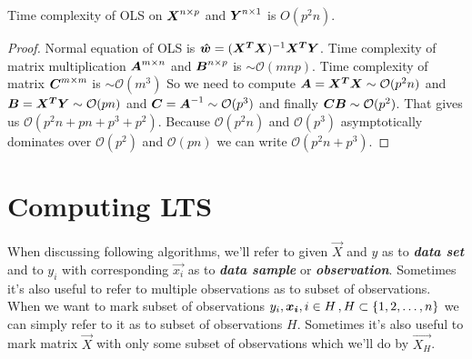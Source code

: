\begin{lemma}
	Time complexity of OLS  on $\m{X}^{n \times p}$ and $\m{Y}^{n \times 1}$ is $O(p^2n)$.
\end{lemma}

\begin{proof}
	Normal equation of OLS is $\vec{\hat{w}} = (\m{X^T}\m{X})^{-1}\m{X^T}\m{Y}$.
	Time complexity  of matrix multiplication $\m{A}^{m \times n}$ and  $\m{B}^{n \times p}$ is $\sim \mathcal{O}(mnp)$.
	Time complexity of matrix $\m{C}^{m \times m}$ is $\sim \mathcal{O}(m^3)$
	So we need to compute 
	$\m{A} = \m{X^T}\m{X} \sim \mathcal{O}(p^2n)$ and
	$\m{B} = \m{X^T}\m{Y} \sim \mathcal{O}(pn)$ and
	$\m{C} = \m{A}^{-1} \sim \mathcal{O}(p^3)$ and finally 
	$\m{C}\m{B} \sim \mathcal{O}(p^2)$. 
	That gives us $\mathcal{O}(p^2n + pn + p^3 + p^2)$. Because  $\mathcal{O}(p^2n)$ and 
	$\mathcal{O}(p^3)$ asymptotically dominates over $\mathcal{O}(p^2)$ and $\mathcal{O}(pn)$ we can
	write $\mathcal{O}(p^2n + p^3)$.

	
\end{proof}

\section{Computing LTS}

\begin{note}
	When discussing following algorithms, we'll refer to given $\vec{X}$ and $y$ as to \textbf{\textit{data set}} and to $y_i$ with corresponding $\vec{x_i}$ as to \textbf{\textit{data sample}} or \textbf{\textit{observation}}. Sometimes it's also useful to refer to multiple observations as to subset of observations. When we want to mark subset of observations  
	$y_i\\, \vec{x_i}\\, i \in H\,, H \subset \{{1,2,\ldots , n\}}$ we can simply refer to it as to subset of observations $H$. Sometimes it's also useful to mark matrix $\vec{X}$ with only some subset of observations which we'll do by $\vec{X_H}$.  
\end{note}


